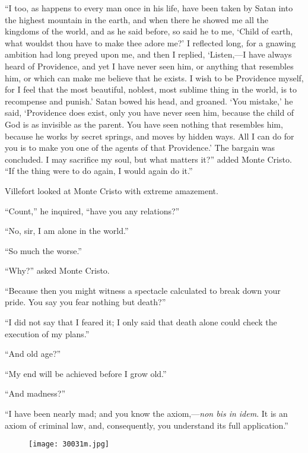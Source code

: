 “I too, as happens to every man once in his life, have been taken by
Satan into the highest mountain in the earth, and when there he showed
me all the kingdoms of the world, and as he said before, so said he to
me, ‘Child of earth, what wouldst thou have to make thee adore me?’ I
reflected long, for a gnawing ambition had long preyed upon me, and
then I replied, ‘Listen,—I have always heard of Providence, and yet I
have never seen him, or anything that resembles him, or which can make
me believe that he exists. I wish to be Providence myself, for I feel
that the most beautiful, noblest, most sublime thing in the world, is
to recompense and punish.’ Satan bowed his head, and groaned. ‘You
mistake,’ he said, ‘Providence does exist, only you have never seen
him, because the child of God is as invisible as the parent. You have
seen nothing that resembles him, because he works by secret springs,
and moves by hidden ways. All I can do for you is to make you one of
the agents of that Providence.’ The bargain was concluded. I may
sacrifice my soul, but what matters it?” added Monte Cristo. “If the
thing were to do again, I would again do it.”

Villefort looked at Monte Cristo with extreme amazement.

“Count,” he inquired, “have you any relations?”

“No, sir, I am alone in the world.”

“So much the worse.”

“Why?” asked Monte Cristo.

“Because then you might witness a spectacle calculated to break down
your pride. You say you fear nothing but death?”

“I did not say that I feared it; I only said that death alone could
check the execution of my plans.”

“And old age?”

“My end will be achieved before I grow old.”

“And madness?”

“I have been nearly mad; and you know the axiom,—\textit{non bis in idem}. It
is an axiom of criminal law, and, consequently, you understand its full
application.”

\begin{figure}[ht]
\texttt{[image: 30031m.jpg]}
\end{figure}

